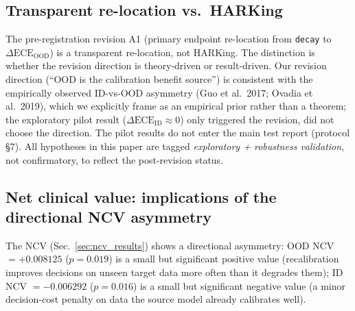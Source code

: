 \documentclass[review,12pt,nonatbib]{elsarticle}
\begin{document}
\subsection{Transparent re-location vs.\ HARKing}
The pre-registration revision A1 (primary endpoint re-location from
\texttt{decay} to $\Delta\text{ECE}_{\text{OOD}}$) is a transparent
re-location, not HARKing. The distinction
\cite{lakens2019prereg,nosek2019prereg} is whether the revision
direction is theory-driven or
result-driven. Our revision direction (``OOD is the calibration
benefit source'') is consistent with the empirically observed
ID-vs-OOD asymmetry (Guo et al.\ 2017; Ovadia et al.\ 2019), which we
explicitly frame as an empirical prior rather than a theorem; the
exploratory pilot result ($\Delta\text{ECE}_{\text{ID}}\approx 0$)
only triggered the revision, did not choose the direction. The
pilot results do not enter the main test report (protocol \S7).
All hypotheses in this paper are tagged \emph{exploratory + robustness
validation}, not confirmatory, to reflect the post-revision status.

\subsection{Net clinical value: implications of the directional NCV asymmetry}
\label{sec:ncv_discussion}
The NCV (Sec.~\ref{sec:ncv_results}) shows a directional asymmetry: OOD
NCV $= +0.008125$ ($p = 0.019$) is a small but significant positive value
(recalibration improves decisions on unseen target data more often than it
degrades them); ID NCV $= -0.006292$ ($p = 0.016$) is a small but
significant negative value (a minor decision-cost penalty on data the
source model already calibrates well).
\end{document}
